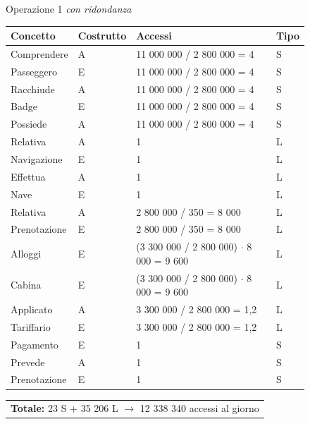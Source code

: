 \documentclass[a4paper, titlepage]{report}
\begin{document}
    \begin{figure}[h]
		\centering
		Operazione 1 \textit{con ridondanza}\\
		\begin{tabular}{L{3cm}C{2.5cm}C{4cm}C{2.5cm}}
			\rule[-2mm]{0mm}{0.65cm}{}
			\textbf{Concetto} & \textbf{Costrutto} &\textbf{Accessi} & \textbf{Tipo} \\
			\hline\rule[-2mm]{0mm}{0.65cm}{}
			Comprendere & A & 11 000 000 / 2 800 000 = 4 & S \\
			\hline\rule[-2mm]{0mm}{0.65cm}{}
			Passeggero & E & 11 000 000 / 2 800 000 = 4 & S \\
			\hline\rule[-2mm]{0mm}{0.65cm}{}
			Racchiude & A & 11 000 000 / 2 800 000 = 4 & S \\
			\hline\rule[-2mm]{0mm}{0.65cm}{}
			Badge & E & 11 000 000 / 2 800 000 = 4 & S \\
			\hline\rule[-2mm]{0mm}{0.65cm}{}
			Possiede & A & 11 000 000 / 2 800 000 = 4 & S \\
			\hline\rule[-2mm]{0mm}{0.65cm}{}
			Relativa & A & 1 & L \\
			\hline\rule[-2mm]{0mm}{0.65cm}{}	
			Navigazione & E & 1 & L \\
			\hline\rule[-2mm]{0mm}{0.65cm}{}
			Effettua & A & 1 & L \\
			\hline\rule[-2mm]{0mm}{0.65cm}{}
			Nave & E & 1 & L \\
			\hline\rule[-2mm]{0mm}{0.65cm}{}
			Relativa & A & 2 800 000 / 350 = 8 000 & L \\
			\hline\rule[-2mm]{0mm}{0.65cm}{}
			Prenotazione & E & 2 800 000 / 350 = 8 000 & L \\
			\hline\rule[-2mm]{0mm}{0.65cm}{}
			Alloggi & E & (3 300 000 / 2 800 000) $\cdot$ 8 000 = 9 600 & L \\
			\hline\rule[-2mm]{0mm}{0.65cm}{}
			Cabina & E & (3 300 000 / 2 800 000) $\cdot$ 8 000 = 9 600 & L \\
			\hline\rule[-2mm]{0mm}{0.65cm}{}
            Applicato & A & 3 300 000 / 2 800 000 = 1,2 & L \\
            \hline\rule[-2mm]{0mm}{0.65cm}{}
            Tariffario & E & 3 300 000 / 2 800 000 = 1,2 & L \\
            \hline\rule[-2mm]{0mm}{0.65cm}{}
			Pagamento & E & 1 & S \\
			\hline\rule[-2mm]{0mm}{0.65cm}{}
			Prevede & A & 1 & S \\
            \hline\rule[-2mm]{0mm}{0.65cm}{}
			Prenotazione & E & 1 & S \\
		\end{tabular}
		\begin{tabular}{C{13.9cm}}
			\rule[-4mm]{0mm}{1cm}{}	
			 \textbf{Totale:} 23 S + 35 206 L $\to$ 12 338 340 accessi al giorno
		\end{tabular}
	\end{figure}
\end{document}
